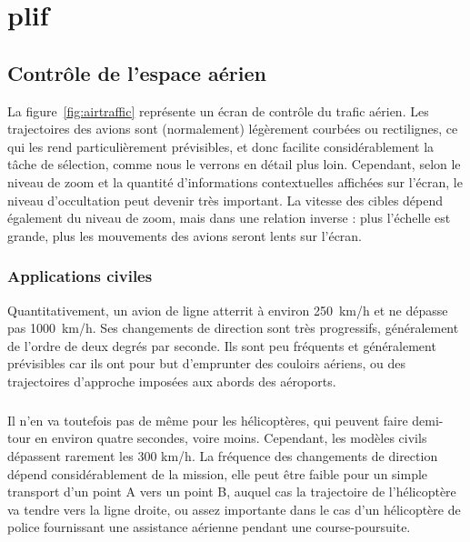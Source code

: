 
\chapter[Contexte/Besoin/Applications]{plif}
\minitoc
\label{chap1}
\cleardoublepage

	\section{Contrôle de l'espace aérien}
	La figure~\ref{fig:airtraffic} représente un écran de contrôle du trafic aérien. Les trajectoires des avions sont (normalement) légèrement courbées ou rectilignes, ce qui les rend particulièrement prévisibles, et donc facilite considérablement la tâche de sélection, comme nous le verrons en détail plus loin. Cependant, selon le niveau de zoom et la quantité d'informations contextuelles affichées sur l'écran, le niveau d'occultation peut devenir très important. La vitesse des cibles dépend également du niveau de zoom, mais dans une relation inverse : plus l'échelle est grande, plus les mouvements des avions seront lents sur l'écran.
	
	\subsection{Applications civiles}
	Quantitativement, un avion de ligne atterrit à environ 250~km/h et ne dépasse pas 1000~km/h. Ses changements de direction sont très progressifs, généralement de l'ordre de deux degrés par seconde. Ils sont peu fréquents et généralement prévisibles car ils ont pour but d'emprunter des couloirs aériens, ou des trajectoires d'approche imposées aux abords des aéroports.

	\paragraph{}
	Il n'en va toutefois pas de même pour les hélicoptères, qui peuvent faire demi-tour en environ quatre secondes, voire moins. Cependant, les modèles civils dépassent rarement les 300 km/h. La fréquence des changements de direction dépend considérablement de la mission, elle peut être faible pour un simple transport d'un point A vers un point B, auquel cas la trajectoire de l'hélicoptère va tendre vers la ligne droite, ou assez importante dans le cas d'un hélicoptère de police fournissant une assistance aérienne pendant une course-poursuite.
	
